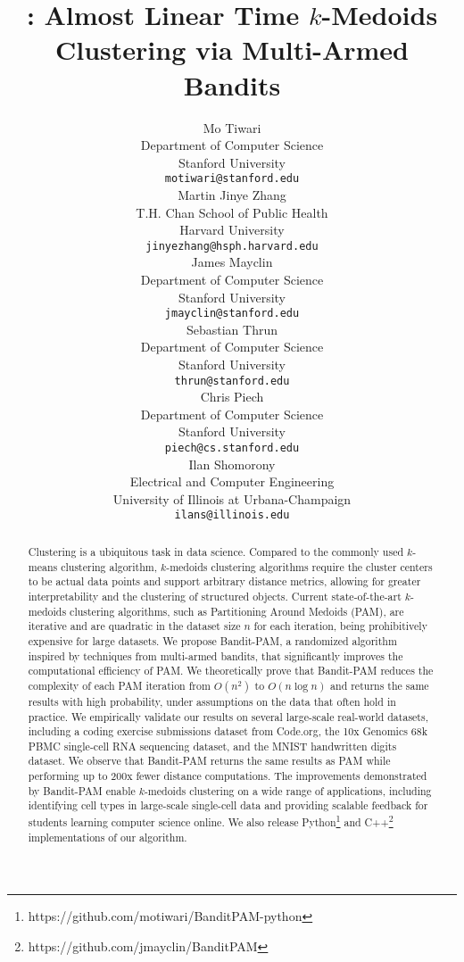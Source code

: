 \documentclass{article}
\title{\algnamenospace: Almost Linear Time $k$-Medoids Clustering via Multi-Armed Bandits}
\author{%
  Mo Tiwari  \\
  Department of Computer Science\\
  Stanford University\\
  \texttt{motiwari@stanford.edu} \\
   \And
   Martin Jinye Zhang \\
   T.H. Chan School of Public Health \\
   Harvard University \\
   \texttt{jinyezhang@hsph.harvard.edu} \\
   \And
   James Mayclin \\
   Department of Computer Science\\
   Stanford University\\
   \texttt{jmayclin@stanford.edu} \\
   \And
   Sebastian Thrun \\
   Department of Computer Science\\
   Stanford University\\
   \texttt{thrun@stanford.edu} \\
   \And
   Chris Piech \\
   Department of Computer Science\\
   Stanford University\\
   \texttt{piech@cs.stanford.edu} \\
   \And
   Ilan Shomorony\\
   Electrical and Computer Engineering\\
   University of Illinois at Urbana-Champaign\\
   \texttt{ilans@illinois.edu}
}
\newcommand{\martin}[1]{\noindent{\textcolor{blue}{\textbf{ Martin:} \textsf{#1} }}}
\newcommand{\algnamenospace}{Bandit-PAM}
\newcommand{\algname}{Bandit-PAM }
\begin{document}
\maketitle

\begin{abstract}


Clustering is a ubiquitous task in data science.
Compared to the commonly used $k$-means clustering algorithm, $k$-medoids clustering algorithms require the cluster centers to be actual data points and support arbitrary distance metrics, allowing for greater interpretability and the clustering of structured objects.
Current state-of-the-art $k$-medoids clustering algorithms, such as Partitioning Around Medoids (PAM), are iterative and are quadratic in the dataset size $n$ for each iteration, being prohibitively expensive for large datasets.
We propose \algnamenospace, a randomized algorithm inspired by techniques from multi-armed bandits, that significantly improves the computational efficiency of PAM.
We theoretically prove that \algname reduces the complexity of each PAM iteration from $O(n^2)$ to $O(n\log n)$ and returns the same results with high probability, under assumptions on the data that often hold in practice.
We empirically validate our results on several large-scale real-world datasets, including a coding exercise submissions dataset from Code.org, the 10x Genomics 68k PBMC single-cell RNA sequencing dataset, and the MNIST handwritten digits dataset.
We observe that \algname returns the same results as PAM while performing up to 200x fewer distance computations. 
The improvements demonstrated by \algname enable $k$-medoids clustering on a wide range of applications, including identifying cell types in large-scale single-cell data and providing scalable feedback for students learning computer science online. We also release Python\footnote{https://github.com/motiwari/BanditPAM-python} and C++\footnote{https://github.com/jmayclin/BanditPAM} implementations of our algorithm.



\end{abstract}
\end{document}
